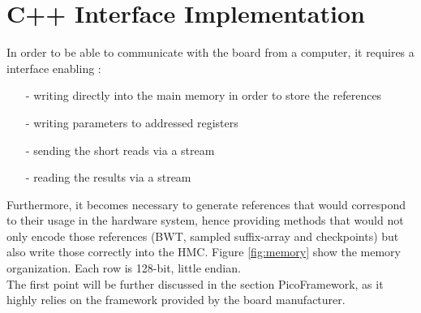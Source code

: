 \section{C++ Interface Implementation}

In order to be able to communicate with the board from a computer, it requires a interface enabling :
\begin{itemize}
    \item [-] writing directly into the main memory in order to store the references
    \item [-]writing parameters to addressed registers
    \item [-] sending the short reads via a stream
    \item [-] reading the results via a stream
\end{itemize}

Furthermore, it becomes necessary to generate references that would correspond to their usage in the hardware system, hence providing methods that would not only encode those references (BWT, sampled suffix-array and checkpoints) but also write those correctly into the HMC. Figure \ref{fig:memory} show the memory organization. Each row is 128-bit, little endian. \\

The first point will be further discussed in the section PicoFramework, as it highly relies on the framework provided by the board manufacturer.


